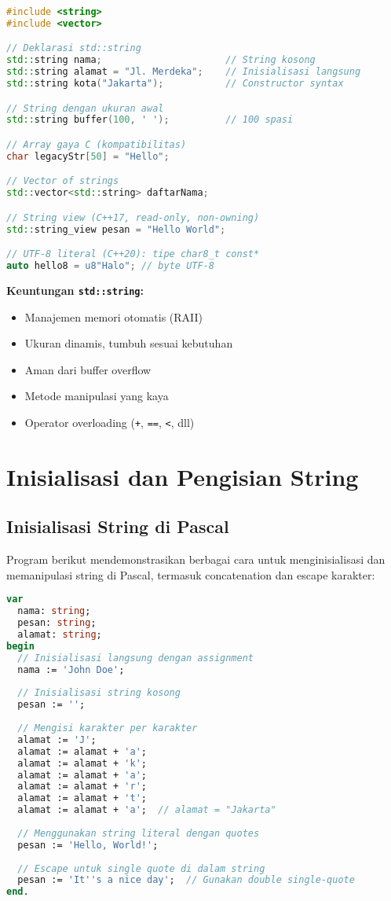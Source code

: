 \documentclass[../main.tex]{subfiles}
\begin{document}
\begin{lstlisting}[language=C++, caption={Deklarasi string di C++}]
#include <string>
#include <vector>

// Deklarasi std::string
std::string nama;                      // String kosong
std::string alamat = "Jl. Merdeka";    // Inisialisasi langsung
std::string kota("Jakarta");           // Constructor syntax

// String dengan ukuran awal
std::string buffer(100, ' ');          // 100 spasi

// Array gaya C (kompatibilitas)
char legacyStr[50] = "Hello";

// Vector of strings
std::vector<std::string> daftarNama;

// String view (C++17, read-only, non-owning)
std::string_view pesan = "Hello World";

// UTF-8 literal (C++20): tipe char8_t const*
auto hello8 = u8"Halo"; // byte UTF-8
\end{lstlisting}

\textbf{Keuntungan \texttt{std::string}:}
\begin{itemize}
  \item Manajemen memori otomatis (RAII)
  \item Ukuran dinamis, tumbuh sesuai kebutuhan
  \item Aman dari buffer overflow
  \item Metode manipulasi yang kaya
  \item Operator overloading (\texttt{+}, \texttt{==}, \texttt{<}, dll)
\end{itemize}

\section{Inisialisasi dan Pengisian String}

\subsection{Inisialisasi String di Pascal}

Program berikut mendemonstrasikan berbagai cara untuk menginisialisasi dan memanipulasi string di Pascal, termasuk concatenation dan escape karakter:

\begin{lstlisting}[language=Pascal, caption={Inisialisasi string di Pascal}]
var
  nama: string;
  pesan: string;
  alamat: string;
begin
  // Inisialisasi langsung dengan assignment
  nama := 'John Doe';
  
  // Inisialisasi string kosong
  pesan := '';
  
  // Mengisi karakter per karakter
  alamat := 'J';
  alamat := alamat + 'a';
  alamat := alamat + 'k';
  alamat := alamat + 'a';
  alamat := alamat + 'r';
  alamat := alamat + 't';
  alamat := alamat + 'a';  // alamat = "Jakarta"
  
  // Menggunakan string literal dengan quotes
  pesan := 'Hello, World!';
  
  // Escape untuk single quote di dalam string
  pesan := 'It''s a nice day';  // Gunakan double single-quote
end.
\end{lstlisting}
\end{document}
